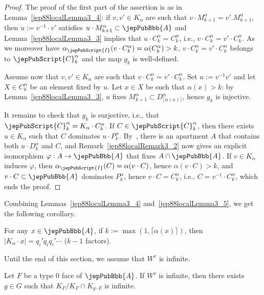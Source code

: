 \begin{proof}
The proof of the first part of the assertion is as in Lemma~\ref{jep88localLemma3_4}: if $v,v'\in K_\alpha$ are such that $v\cdot M_{k+1}^\alpha=v'.M_{k+1}^\alpha$, then $u:=v^{-1}\cdot v'$ satisfies $u\cdot M_{k+1}^\alpha\subset\jepPubBbb{A}$ and Lemma~\ref{jep88localLemma3_3} implies that $u\cdot C_k^\alpha=C_k^\alpha$, i.e., $v\cdot C_k^\alpha=v'\cdot C_k^\alpha$. As we moreover have $\alpha_{\jepPubScript{I}}(v\cdot C_k^\alpha)=\alpha(C_k^\alpha)>k$, $v\cdot C_k^\alpha=v'\cdot C_k^\alpha$ belongs to $\jepPubScript{C}_k^\alpha$ and the map $g_k$ is well-defined.

Assume now that $v,v'\in K_\alpha$ are such that $v\cdot C_k^\alpha=v'\cdot C_k^\alpha$. Set $u:=v^{-1}v'$ and let $X\in C_k^\alpha$ be an element fixed by $u$. Let $x\in X$ be such that $\alpha(x)>k$: by Lemma~\ref{jep88localLemma3_3}, $u$ fixes $M_{k+1}^\alpha\subset D_{\lceil\alpha(x)\rceil}^\alpha$, hence $g_k$ is injective.

It remains to check that $g_k$ is surjective, i.e., that $\jepPubScript{C}_k^\alpha=K_\alpha\cdot C_k^\alpha$. If $C\in\jepPubScript{C}_k^\alpha$, then there exists $u\in K_\alpha$ such that $C$ dominates $u\cdot P_k^\alpha$. By~\cite[Prop.~2.9.1)]{jep88refRou11}, there is an apartment $A$ that contains both $u\cdot D_k^\alpha$ and $C$, and Remark~\ref{jep88localRemark3_2} now gives an explicit isomorphism $\varphi:A\to\jepPubBbb{A}$ that fixes $A\cap\jepPubBbb{A}$. If $v\in K_\alpha$ induces $\varphi$, then $\alpha_{\jepPubScript{I}}(C)=\alpha(v\cdot C)$, hence $\alpha(v\cdot C)>k$, and $v\cdot C\subset\jepPubBbb{A}$ dominates $P_k^\alpha$, hence $v\cdot C=C_k^\alpha$, i.e., $C=v^{-1}\cdot C_k^\alpha$, which ends the proof.
\end{proof}
Combining Lemmas~\ref{jep88localLemma3_4} and~\ref{jep88localLemma3_5}, we get the following corollary.
\begin{corollary}\label{jep88localCorollary3_6}
For any $x\in\jepPubBbb{A}$, if $k:=\max(1,\lceil\alpha(x)\rceil)$, then $|K_\alpha\cdot x|=q_i'q_iq_i'\cdots$ ($k-1$ factors).
\end{corollary}
Until the end of this section, we assume that $W^v$ is infinite.
\begin{lemma}\label{jep88localLemma3_7}
Let $F$ be a type $0$ face of $\jepPubBbb{A}$. If $W^v$ is infinite, then there exists $g\in G$ such that $K_F/K_F\cap K_{g\cdot F}$ is infinite.
\end{lemma}
